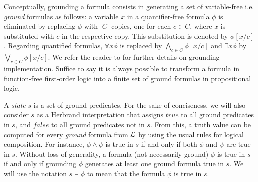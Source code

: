 \documentclass[letterpaper]{article} %
\begin{document}
Conceptually, grounding a formula consists in generating a set of variable-free i.e. {\it ground} formulas \cite{helmer} as follows: a variable $x$ in a quantifier-free formula $\phi$ is eliminated by replacing $\phi$ with $|C|$ copies, one for each $c \in C$, where $x$ is substituted with $c$ in the respective copy. This substitution is denoted by $\phi[x/c]$. Regarding quantified formulas, $\forall x \phi$ is replaced by $\bigwedge_{c \in C} \phi[x/c]$ and $\exists x \phi$ by $\bigvee_{c \in C} \phi[x/c]$. We refer the reader to \cite{xx} for further details on grounding implementation. Suffice to say it is always possible to transform a formula in function-free first-order logic into a finite set of ground formulas in propositional logic.

A {\it state} $s$ is a set of ground predicates. For the sake of conciseness, we will also consider $s$ as a Herbrand interpretation that assigns $true$ to all ground predicates in $s$, and $false$ to all ground predicates not in $s$. From this, a truth value can be computed for every {\it ground} formula from ${\cal{L}}$ by using the usual rules for logical composition. For instance, $\phi \wedge \psi$ is true in $s$ if and only if both $\phi$ and $\psi$ are true in $s$. Without loss of generality, a formula (not necessarily ground) $\phi$ is true in $s$ if and only if grounding $\phi$ generates at least one ground formula true in $s$. We will use the notation $s \models \phi$ to mean that the formula $\phi$ is true in $s$.

\end{document}
